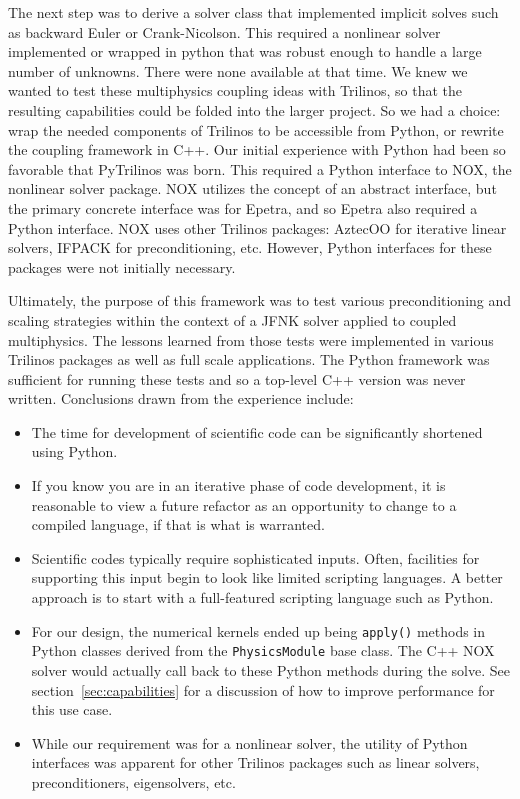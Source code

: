 \documentclass[11pt]{article}
\begin{document}
The next step was to derive a solver class that implemented implicit solves such as backward Euler or Crank-Nicolson.  This required a nonlinear solver implemented or wrapped in python that was robust enough to handle a large number of unknowns.  There were none available at that time.  We knew we wanted to test these multiphysics coupling ideas with Trilinos, so that the resulting capabilities could be folded into the larger project.  So we had a choice: wrap the needed components of Trilinos to be accessible from Python, or rewrite the coupling framework in C++.  Our initial experience with Python had been so favorable that PyTrilinos was born.  This required a Python interface to NOX, the nonlinear solver package.  NOX utilizes the concept of an abstract interface, but the primary concrete interface was for Epetra, and so Epetra also required a Python interface.  NOX uses other Trilinos packages: AztecOO for iterative linear solvers, IFPACK for preconditioning, etc.  However, Python interfaces for these packages were not initially necessary.

Ultimately, the purpose of this framework was to test various preconditioning and scaling strategies within the context of a JFNK solver applied to coupled multiphysics.  The lessons learned from those tests were implemented in various Trilinos packages as well as full scale applications.  The Python framework was sufficient for running these tests and so a top-level C++ version was never written.  Conclusions drawn from the experience include:

\begin{itemize}

\item The time for development of scientific code can be significantly shortened using Python.

\item If you know you are in an iterative phase of code development, it is reasonable to view a future refactor as an opportunity to change to a compiled language, if that is what is warranted.

\item Scientific codes typically require sophisticated inputs.  Often, facilities for supporting this input begin to look like limited scripting languages.  A better approach is to start with a full-featured scripting language such as Python.

\item For our design, the numerical kernels ended up being {\tt apply()} methods in Python classes derived from the {\tt PhysicsModule} base class.  The C++ NOX solver would actually call back to these Python methods during the solve.  See section~\ref{sec:capabilities} for a discussion of how to improve performance for this use case.

\item While our requirement was for a nonlinear solver, the utility of Python interfaces was apparent for other Trilinos packages such as linear solvers, preconditioners, eigensolvers, etc.

\end{itemize}
\end{document}
